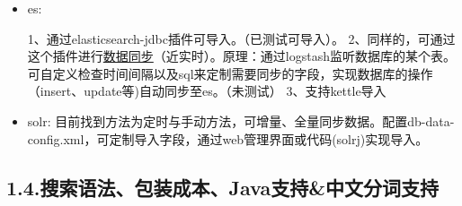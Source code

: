 \documentclass{article}
\begin{document}
\begin{itemize}%

\item{}
es:%

1、通过elasticsearch-jdbc插件可导入。（已测试可导入）。    \mdbr
{}2、同样的，可通过这个插件进行\href{https://www.elastic.co/guide/en/logstash/current/plugins-inputs-jdbc.html}{数据同步}（近实时）。原理：通过logstash监听数据库的某个表。可自定义检查时间间隔以及sql来定制需要同步的字段，实现数据库的操作（insert、update等)自动同步至es。（未测试）    \mdbr
{}3、支持kettle导入%

\item{}
solr: 目前找到方法为定时与手动方法，可增量、全量同步数据。配置db-data-config.xml，可定制导入字段，通过web管理界面或代码(solrj)实现导入。%
\end{itemize}%

\subsection{1.4.\hspace*{0.5em}搜索语法、包装成本、Java支持\&中文分词支持}\label{sec-java}%

\noindent{}       %
\end{document}
